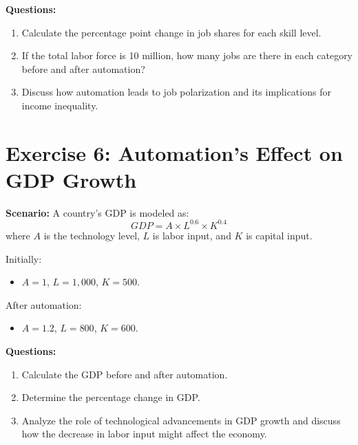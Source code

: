 \documentclass[12pt]{article}
\begin{document}
\textbf{Questions:}
\begin{enumerate}
    \item Calculate the percentage point change in job shares for each skill level.
    \item If the total labor force is 10 million, how many jobs are there in each category before and after automation?
    \item Discuss how automation leads to job polarization and its implications for income inequality.
\end{enumerate}

\section*{Exercise 6: Automation's Effect on GDP Growth}
\textbf{Scenario:} A country’s GDP is modeled as:
\[ GDP = A \times L^{0.6} \times K^{0.4} \]
where $A$ is the technology level, $L$ is labor input, and $K$ is capital input.

Initially:
\begin{itemize}
    \item $A = 1$, $L = 1,000$, $K = 500$.
\end{itemize}

After automation:
\begin{itemize}
    \item $A = 1.2$, $L = 800$, $K = 600$.
\end{itemize}

\textbf{Questions:}
\begin{enumerate}
    \item Calculate the GDP before and after automation.
    \item Determine the percentage change in GDP.
    \item Analyze the role of technological advancements in GDP growth and discuss how the decrease in labor input might affect the economy.
\end{enumerate}
\end{document}
